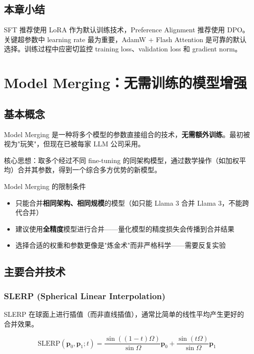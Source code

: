 \documentclass[a4paper]{article}
\begin{document}
\subsection{本章小结}

SFT 推荐使用 LoRA 作为默认训练技术，Preference Alignment 推荐使用 DPO。关键超参数中 learning rate 最为重要，AdamW + Flash Attention 是可靠的默认选择。训练过程中应密切监控 training loss、validation loss 和 gradient norm。

\newpage
\section{Model Merging：无需训练的模型增强}

\subsection{基本概念}

Model Merging 是一种将多个模型的参数直接组合的技术，\textbf{无需额外训练}。最初被视为"玩笑"，但现在已被每家 LLM 公司采用。

核心思想：取多个经过不同 fine-tuning 的同架构模型，通过数学操作（如加权平均）合并其参数，得到一个综合多方优势的新模型。

\begin{warningbox}{Model Merging 的限制条件}
\begin{itemize}
    \item 只能合并\textbf{相同架构、相同规模}的模型（如只能 Llama 3 合并 Llama 3，不能跨代合并）
    \item 建议使用\textbf{全精度}模型进行合并——量化模型的精度损失会传播到合并结果
    \item 选择合适的权重和参数更像是"炼金术"而非严格科学——需要反复实验
\end{itemize}
\end{warningbox}

\subsection{主要合并技术}

\subsubsection{SLERP (Spherical Linear Interpolation)}

SLERP 在球面上进行插值（而非直线插值），通常比简单的线性平均产生更好的合并效果。

$$\text{SLERP}(\mathbf{p}_0, \mathbf{p}_1; t) = \frac{\sin((1-t)\Omega)}{\sin\Omega}\mathbf{p}_0 + \frac{\sin(t\Omega)}{\sin\Omega}\mathbf{p}_1$$
\end{document}

